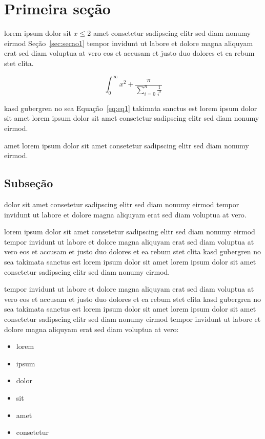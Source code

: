 \section{\label{sec:secao1}Primeira seção}

lorem ipsum dolor sit $x\leq 2$  amet consetetur sadipscing elitr
sed diam nonumy eirmod Seção~\ref{sec:secao1} tempor invidunt ut
labore et dolore magna aliquyam erat sed diam voluptua at vero eos
et accusam et justo duo dolores et ea rebum stet
clita.~\cite{OLIVEIRAAPL08}

\begin{equation}\label{eq:eq1}
    \int_{0}^{\infty}{x^2 + \frac{\pi}{\sum_{i=0}^{n}{\frac{1}{i^2}}}}
\end{equation}

kasd gubergren no sea Equação~\eqref{eq:eq1} takimata sanctus est
lorem ipsum dolor sit amet lorem ipsum dolor sit amet consetetur
sadipscing elitr sed diam nonumy eirmod.~\cite{PICCOLIAPL11}

amet lorem ipsum dolor sit amet consetetur sadipscing elitr sed
diam nonumy eirmod.~\cite{PICCOLIDM08}

\subsection{Subseção}

dolor sit amet consetetur sadipscing elitr sed diam nonumy eirmod
tempor invidunt ut labore et dolore magna aliquyam erat sed diam
voluptua at vero.

lorem ipsum dolor sit amet consetetur sadipscing elitr sed diam
nonumy eirmod tempor invidunt ut labore et dolore magna aliquyam
erat sed diam voluptua at vero eos et accusam et justo duo dolores
et ea rebum stet clita kasd gubergren no sea takimata sanctus est
lorem ipsum dolor sit amet lorem ipsum dolor sit amet consetetur
sadipscing elitr sed diam nonumy eirmod.

tempor invidunt ut labore et dolore magna aliquyam erat sed diam voluptua at
vero eos et accusam et justo duo dolores et ea rebum stet clita kasd
gubergren no sea takimata sanctus est lorem ipsum dolor sit amet lorem ipsum
dolor sit amet consetetur sadipscing elitr sed diam nonumy eirmod tempor
invidunt ut labore et dolore magna aliquyam erat sed diam voluptua
at vero:

\begin{itemize}
   \item lorem
   \item ipsum
   \item dolor
   \item sit
   \item amet
   \item consetetur
\end{itemize}

